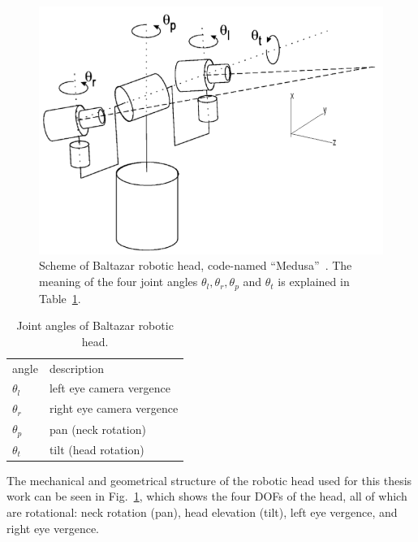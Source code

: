 \begin{figure}
\centering
\includegraphics[scale=0.4]{figures/balta_head_scheme}
\caption[Scheme of Baltazar robotic head]{Scheme of Baltazar robotic head, code-named ``Medusa''~\cite{bernardino:1999}. The meaning of the four joint angles $\theta_l, \theta_r, \theta_p$ and $\theta_t$ is explained in Table~\ref{tab:balta_head_joints}.}
\label{img:balta_head_scheme}
\end{figure}

\begin{table}
\caption[Joint angles of Baltazar robotic head]{Joint angles of Baltazar robotic head.}
\label{tab:balta_head_joints}
\centering
\medskip
\begin{tabular}{*{2}{l}} %
\toprule
angle & description \\
\otoprule
$\theta_l$ & left eye camera vergence \\
\midrule
$\theta_r$ & right eye camera vergence \\
\midrule
$\theta_p$ & pan (neck rotation) \\
\midrule
$\theta_t$ & tilt (head rotation) \\
\bottomrule
\end{tabular}
\end{table}

The mechanical and geometrical structure of the robotic head used for this thesis work can be seen in Fig.~\ref{img:balta_head_scheme}, which shows the four \acp{DOF} of the head, all of which are rotational: neck rotation (pan), head elevation (tilt), left eye vergence, and right eye vergence.


